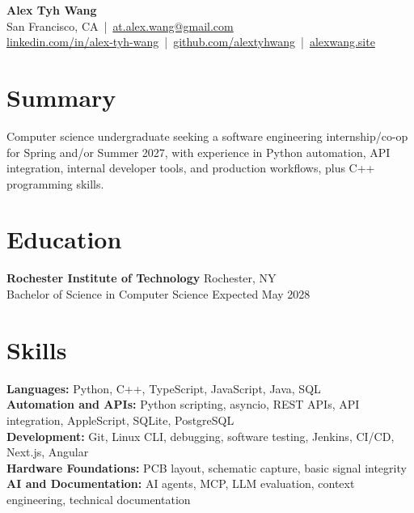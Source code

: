 \documentclass[10pt,letterpaper]{article}
\begin{document}
\begin{center}
{\Large \textbf{Alex Tyh Wang}}\\
San Francisco, CA \,|\, \href{mailto:at.alex.wang@gmail.com}{at.alex.wang@gmail.com}\\
\small \href{https://www.linkedin.com/in/alex-tyh-wang/}{linkedin.com/in/alex-tyh-wang} \,|\, \href{https://github.com/alextyhwang}{github.com/alextyhwang} \,|\, \href{https://alexwang.site}{alexwang.site}
\end{center}

\section*{Summary}
Computer science undergraduate seeking a software engineering internship/co-op for Spring and/or Summer 2027, with experience in Python automation, API integration, internal developer tools, and production workflows, plus C++ programming skills.

\section*{Education}
\textbf{Rochester Institute of Technology} \hfill Rochester, NY\\
Bachelor of Science in Computer Science \hfill Expected May 2028

\section*{Skills}
\textbf{Languages:} Python, C++, TypeScript, JavaScript, Java, SQL\\
\textbf{Automation and APIs:} Python scripting, asyncio, REST APIs, API integration, AppleScript, SQLite, PostgreSQL\\
\textbf{Development:} Git, Linux CLI, debugging, software testing, Jenkins, CI/CD, Next.js, Angular\\
\textbf{Hardware Foundations:} PCB layout, schematic capture, basic signal integrity\\
\textbf{AI and Documentation:} AI agents, MCP, LLM evaluation, context engineering, technical documentation
\end{document}
